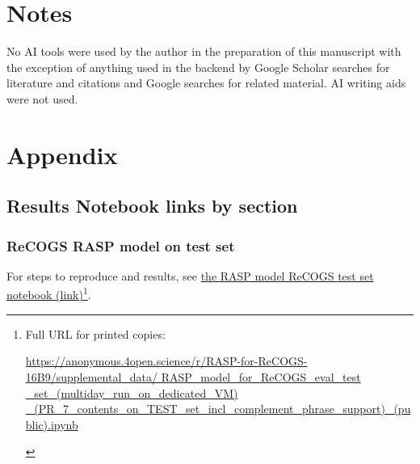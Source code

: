 \documentclass[11pt]{article}
\begin{document}


\section*{Notes}
No AI tools were used by the author in the preparation of this manuscript with the exception of anything used in the backend by Google Scholar searches for literature and citations and Google searches for related material. AI writing aids were not used.

\onecolumn
\section{Appendix}

\subsection{Results Notebook links by section}
\label{results_notebook_links_by_section}

\subsubsection{ReCOGS RASP model on test set}

For steps to reproduce and results, see \href{https://anonymous.4open.science/r/RASP-for-ReCOGS-16B9/supplemental\_data/RASP\_model\_for\_ReCOGS\_eval\_test\_set\_(multiday\_run\_on\_dedicated\_VM)\_(PR\_7\_contents\_on\_TEST\_set\_incl\_complement\_phrase\_support)\_(public).ipynb}{the RASP model ReCOGS test set notebook (link)}\footnote{\begin{footnotesize}Full URL for printed copies: 

\href{https://anonymous.4open.science/r/RASP-for-ReCOGS-16B9/supplemental\_data/RASP\_model\_for\_ReCOGS\_eval\_test\_set\_(multiday\_run\_on\_dedicated\_VM)\_(PR\_7\_contents\_on\_TEST\_set\_incl\_complement\_phrase\_support)\_(public).ipynb}{https://anonymous.4open.science/r/RASP-for-ReCOGS-16B9/supplemental\_data/
RASP\_model\_for\_ReCOGS\_eval\_test
\_set\_(multiday\_run\_on\_dedicated\_VM)
\_(PR\_7\_contents\_on\_TEST\_set\_incl\_complement\_phrase\_support)\_(public).ipynb}\end{footnotesize}}.
\end{document}
